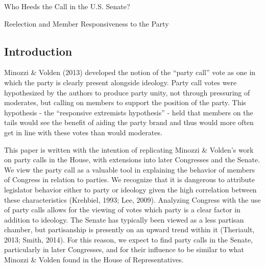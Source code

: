 \documentclass[12pt]{article}
\begin{document}
\begin{center}
{\Large Who Heeds the Call in the U.S. Senate?}

{\large Reelection and Member Responsiveness to the Party}
\end{center}

\begin{abstract}
	\singlespacing
	\noindent
	In this paper, we replicate the findings of Minozzi \& Volden (2013) with some modifications of their methodology. We show that their hypotheses regarding party unity coming through the party working to unite more extreme (rather than more moderate) members holds not only in the House, but also the Senate. Further, we show the usefulness of separating votes in this way by considering changes in member behavior when they are up for reelection.
\end{abstract}



\subsection{Introduction}

Minozzi \& Volden (2013) developed the notion of the ``party call'' vote as one in which the party is clearly present alongside ideology. Party call votes were hypothesized by the authors to produce party unity, not through pressuring of moderates, but calling on members to support the position of the party. This hypothesis - the ``responsive extremists hypothesis'' - held that members on the tails would see the benefit of aiding the party brand and thus would more often get in line with these votes than would moderates.

This paper is written with the intention of replicating Minozzi \& Volden's work on party calls in the House, with extensions into later Congresses and the Senate. We view the party call as a valuable tool in explaining the behavior of members of Congress in relation to parties. We recognize that it is dangerous to attribute legislator behavior either to party or ideology given the high correlation between these characteristics (Krehbiel, 1993; Lee, 2009). Analyzing Congress with the use of party calls allows for the viewing of votes which party is a clear factor in addition to ideology. The Senate has typically been viewed as a less partisan chamber, but partisanship is presently on an upward trend within it (Theriault, 2013; Smith, 2014). For this reason, we expect to find party calls in the Senate, particularly in later Congresses, and for their influence to be similar to what Minozzi \& Volden found in the House of Representatives.
\end{document}
